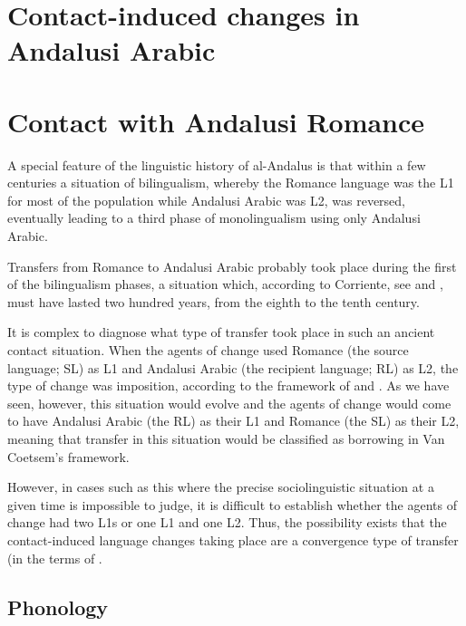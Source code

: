 \documentclass[output=paper,modfonts,nonflat]{langsci/langscibook}
\begin{document}
\section{Contact-induced changes in Andalusi Arabic} 

 

\section{Contact with Andalusi Romance}



A special feature of the linguistic history of al-Andalus is that within a few centuries a situation of bilingualism, whereby the Romance language was the L1 for most of the population while Andalusi Arabic was L2, was reversed, eventually leading to a third phase of monolingualism using only Andalusi Arabic. 

Transfers from Romance to Andalusi Arabic probably took place during the first of the bilingualism phases, a situation which, according to Corriente, see \citep{Corriente2005} and \citep{Corriente2008}, must have lasted two hundred years, from the eighth to the tenth century. 

It is complex to diagnose what type of transfer took place in such an ancient contact situation. When the agents of change used Romance (the source language; SL) as L1 and Andalusi Arabic (the recipient language; RL) as L2, the type of change was imposition, according to the framework of \citep{Coetsem1988} and \citep{Coetsem2000}. As we have seen, however, this situation would evolve and the agents of change would come to have Andalusi Arabic (the RL) as their L1 and Romance (the SL) as their L2, meaning that transfer in this situation would be classified as borrowing in Van Coetsem’s framework. 

However, in cases such as this where the precise sociolinguistic situation at a given time is impossible to judge, it is difficult to establish whether the agents of change had two L1s or one L1 and one L2. Thus, the possibility exists that the contact-induced language changes taking place are a convergence type of transfer (in the terms of \citep{Lucas2015}. 




\subsection{\label{bkm:Ref12959774}Phonology}
\end{document}
